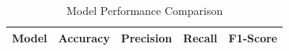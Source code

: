 \begin{table}[h]
\centering
\caption{Model Performance Comparison}
\begin{tabular}{lcccc}
\hline
Model & Accuracy & Precision & Recall & F1-Score \\
\hline
\hline
\end{tabular}
\end{table}
